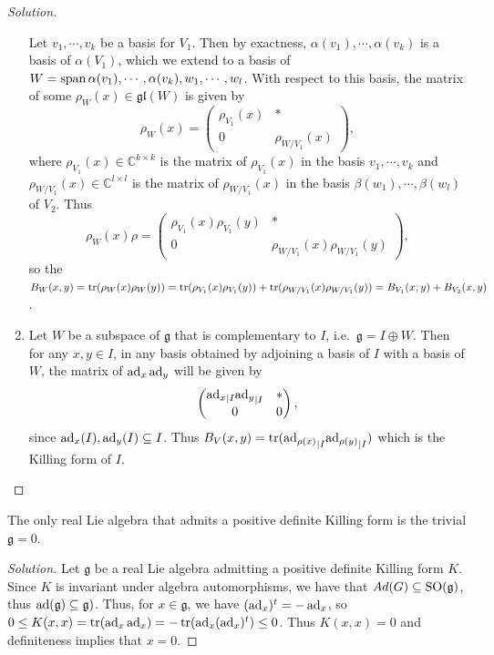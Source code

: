 \documentclass{report}
\begin{document}
\begin{proof}[Solution]
\begin{enumerate}[label = (\roman*)]
    Let $v_1, \cdots, v_k$ be a basis for $V_1$.
    Then by exactness, $\alpha(v_1), \cdots, \alpha(v_k)$ is a basis of $\alpha(V_1)$, which we extend to a basis of $W = \operatorname{span}{\alpha(v_1), \cdots, \alpha(v_k), w_1, \cdots, w_l}$.
    With respect to this basis, the matrix of some $\rho_W(x) \in \mathfrak{gl}(W)$ is given by
    \[
    \rho_W(x) = 
    \begin{pmatrix}
        \rho_{V_1}(x) & *\\
        0 & \rho_{W/V_1}(x)
    \end{pmatrix},
    \]
    where $\rho_{V_1}(x) \in \mathbb C^{k \times k}$ is the matrix of $\rho_{V_1}(x)$ in the basis $v_1, \cdots, v_k$ and $\rho_{W/V_1}(x) \in \mathbb C^{l \times l}$ is the matrix of $\rho_{W/V_1}(x)$ in the basis $\beta(w_1), \cdots, \beta(w_l)$ of $V_2$.
    Thus
    \[
    \rho_W(x)\rho = 
    \begin{pmatrix}
        \rho_{V_1}(x) \rho_{V_1}(y) & *\\
        0 & \rho_{W/V_1}(x)\rho_{W/V_1}(y)
    \end{pmatrix},
    \]
    so the $B_W(x, y) = \operatorname{tr}(\rho_W(x)\rho_W(y)) = \operatorname{tr}(\rho_{V_1}(x)\rho_{V_1}(y)) + \operatorname{tr}(\rho_{W/V_1}(x)\rho_{W/V_1}(y)) = B_{V_1}(x,y) + B_{V_2}(x,y)$.
    \item 
    Let $W$ be a subspace of $\mathfrak g$ that is complementary to $I$, i.e.\ $\mathfrak g = I \oplus W$.
    Then for any $x,y \in I$, in any basis obtained by adjoining a basis of $I$ with a basis of $W$, the matrix of $\operatorname{ad}_x \operatorname{ad}_y$ will be given by
    \[
    \begin{pmatrix}
        {\operatorname{ad}_x}_{|I} {\operatorname{ad}_y}_{|I} & *\\
        0 & 0
    \end{pmatrix},
    \]
    since $\operatorname{ad}_x(I), \operatorname{ad}_y(I) \subseteq I$.
    Thus $B_V(x,y) = \operatorname{tr}({\operatorname{ad}_{\rho(x)}}_{|I} {\operatorname{ad}_{\rho(y)}}_{|I})$ which is the Killing form of $I$.
    \end{enumerate}
    
\end{proof}

\begin{exercise}[Exercise 5.5]
    The only real Lie algebra that admits a positive definite Killing form is the trivial $\mathfrak g = 0$.
\end{exercise}
\begin{proof}[Solution]
    Let $\mathfrak g$ be a real Lie algebra admitting a positive definite Killing form $K$.
    Since $K$ is invariant under algebra automorphisms, we have that $Ad(G) \subseteq \operatorname{{\mathrm{SO}}}(\mathfrak g)$, thus $\ad(\mathfrak g) \subseteq \so(\mathfrak g)$.
    Thus, for $x \in \mathfrak g$, we have $(\operatorname{ad}_x)^t = -\operatorname{ad}_x$, so $0 \leq K(x,x) = \operatorname{tr}(\operatorname{ad}_x \operatorname{ad}_x) = - \operatorname{tr}(\operatorname{ad}_x (\operatorname{ad}_x)^t) \leq 0 $.
    Thus $K(x,x) = 0 $ and definiteness implies that $x = 0$.
\end{proof}
\end{document}
